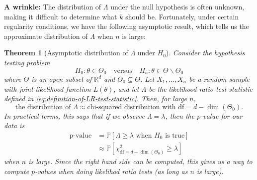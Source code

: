 \documentclass[10pt]{article}
\newtheorem{theorem}{Theorem}
\theoremstyle{definition}
\newcommand{\vt}{\vskip 5mm} %
\newcommand{\Fl}{\vt\noindent\textbf} %
\newcommand{\1}[1]{\textbf{1}_{\left[#1\right]}} %
\def\R{\mathbb{R}} %
\def\P{\mathbb{P}} %
\begin{document}
\Fl{A wrinkle:} The distribution of $\Lambda$ under the null hypothesis is
often unknown, making it difficult to determine what $k$ should be.
Fortunately, under certain regularity conditions, we have the following
asymptotic result, which tells us the approximate distribution of $\Lambda$
when $n$ is large:

\begin{theorem}[Asymptotic distribution of $\Lambda$ under $H_{0}$]
  \label{thm:asymptotic-distribution-lambda-under-H_0}
  Consider the hypothesis testing problem
  \begin{equation*}
    H_{0}: \theta\in \Theta_{0} \quad \text{versus} \quad H_{a}: \theta\in \Theta\backslash \Theta_{0}
  \end{equation*}
  where $\Theta$ is an open subset of $\R^{d}$ and
  $\Theta_{0}\subseteq \Theta$. Let $X_{1},\ldots,X_{n}$ be a random sample
  with joint likelihood function $L(\theta)$, and let $\Lambda$ be the
  likelihood ratio test statistic defined in \cref{eq:definition-of-LR-test-statistic}. Then, for large
  $n$,
  \begin{equation*}
    \text{the distribution of }\Lambda 
    \approx \text{chi-squared distribution with } \text{df} 
    = d-\dim(\Theta_{0}).
  \end{equation*}
  In practical terms, this says that if we observe $\Lambda=\lambda$, then the
  $p$-value for our data is
  \begin{align*}
    \text{p-value}
    &= \P\left[\Lambda \geq \lambda \text{ when }H_{0} \text{ is true}\right] \\
    &\approx \P\left[\chi^{2}_{\mathrm{df}=d-\dim(\Theta_{0})}\geq \lambda\right]
  \end{align*}
  when $n$ is large. Since the right hand side can be computed, this gives us
  a way to compute $p$-values when doing likelihod ratio tests (as long as $n$
  is large).
\end{theorem}
\end{document}
